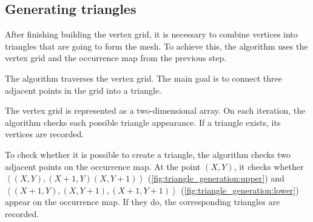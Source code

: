 \subsection{Generating triangles}

After finishing building the vertex grid, it is necessary to combine vertices into triangles that are going to form the mesh. To achieve this, the algorithm uses the vertex grid and the occurrence map from the previous step.

The algorithm traverses the vertex grid. The main goal is to connect three adjacent points in the grid into a triangle.

The vertex grid is represented as a two-dimensional array. On each iteration, the algorithm checks each possible triangle appearance. If a triangle exists, its vertices are recorded.

To check whether it is possible to create a triangle, the algorithm checks two adjacent points on the occurrence map. At the point $(X, Y)$, it checks whether $\left \langle (X, Y), (X+1, Y) (X, Y+1) \right \rangle$ (\autoref{fig:triangle_generation:upper}) and $\left \langle (X+1, Y), (X, Y+1), (X+1, Y+1) \right \rangle$ (\autoref{fig:triangle_generation:lower}) appear on the occurrence map. If they do, the corresponding triangles are recorded.

